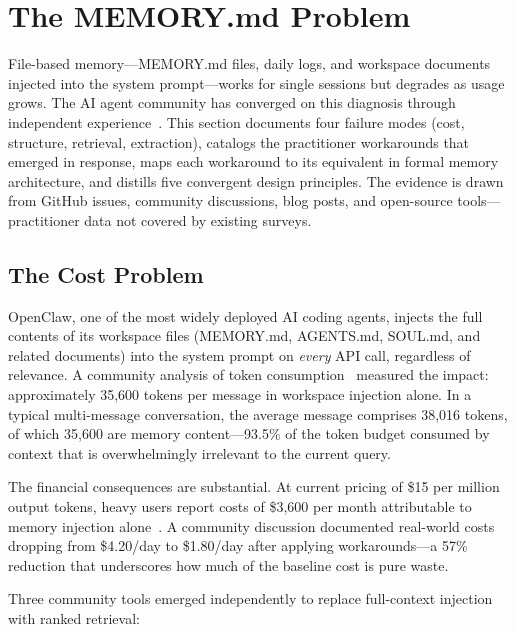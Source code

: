 \section{The MEMORY.md Problem}
\label{sec:memorymd}

File-based memory---MEMORY.md files, daily logs, and workspace
documents injected into the system prompt---works for single sessions
but degrades as usage grows.  The AI agent community has converged on
this diagnosis through independent experience~\cite{zilliz2026b,
chawla2026, fisher2026, azizi2026}.  This section documents four
failure modes (cost, structure, retrieval, extraction), catalogs the
practitioner workarounds that emerged in response, maps each workaround
to its equivalent in formal memory architecture, and distills five
convergent design principles.  The evidence is drawn from GitHub issues,
community discussions, blog posts, and open-source tools---practitioner
data not covered by existing surveys.

\subsection{The Cost Problem}
\label{sec:memorymd-cost}

OpenClaw, one of the most widely deployed AI coding agents, injects the
full contents of its workspace files (MEMORY.md, AGENTS.md, SOUL.md,
and related documents) into the system prompt on \emph{every} API call,
regardless of relevance.  A community analysis of token
consumption~\cite{openclaw9157} measured the impact: approximately
35,600 tokens per message in workspace injection alone.  In a typical
multi-message conversation, the average message comprises 38,016 tokens,
of which 35,600 are memory content---93.5\% of the token budget consumed
by context that is overwhelmingly irrelevant to the current query.

The financial consequences are substantial.  At current pricing of
\$15 per million output tokens, heavy users report costs of
\$3,600 per month attributable to memory injection
alone~\cite{zilliz2026b, azizi2026}.  A community discussion documented
real-world costs dropping from \$4.20/day to \$1.80/day after applying
workarounds---a 57\% reduction that underscores how much of the baseline
cost is pure waste.

Three community tools emerged independently to replace full-context
injection with ranked retrieval:


